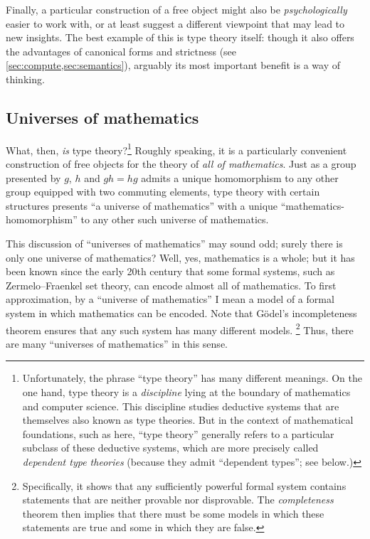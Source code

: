 \documentclass[12pt]{article}
\numberwithin{equation}{section}
\begin{document}
Finally, a particular construction of a free object might also be \emph{psychologically} easier to work with, or at least suggest a different viewpoint that may lead to new insights.
The best example of this is type theory itself: though it also offers the advantages of canonical forms and strictness (see \cref{sec:compute,sec:semantics}), arguably its most important benefit is a way of thinking.


\subsection{Universes of mathematics}
\label{sec:univ-math}

What, then, \emph{is} type theory?\footnote{\label{fn:typetheory}Unfortunately, the phrase ``type theory'' has many different meanings.
On the one hand, type theory is a \emph{discipline} lying at the boundary of mathematics and computer science.
This discipline studies deductive systems that are themselves also known as type theories.
But in the context of mathematical foundations, such as here, ``type theory'' generally refers to a particular subclass of these deductive systems, which are more precisely called \emph{dependent type theories} (because they admit ``dependent types''; see below.)}
Roughly speaking, it is a particularly convenient construction of free objects for the theory of \emph{all of mathematics}.
Just as a group presented by $g$, $h$ and $g h = h g$ admits a unique homomorphism to any other group equipped with two commuting elements, type theory with certain structures presents ``a universe of mathematics'' with a unique ``mathematics-homomorphism'' to any other such universe of mathematics.

This discussion of ``universes of mathematics'' may sound odd; surely there is only one universe of mathematics?
Well, yes, mathematics is a whole; but it has been known since the early 20th century that some formal systems, such as Zermelo--Fraenkel set theory, can encode almost all of mathematics. %
To first approximation, by a ``universe of mathematics'' I mean a model of a formal system in which mathematics can be encoded.
%
Note that G\"odel's incompleteness theorem ensures that any such system has many different models.%
\footnote{Specifically, it shows that any sufficiently powerful formal system contains statements that are neither provable nor disprovable.
The \emph{completeness} theorem then implies that there must be some models in which these statements are true and some in which they are false.}
Thus, there are many ``universes of mathematics'' in this sense.
\end{document}
